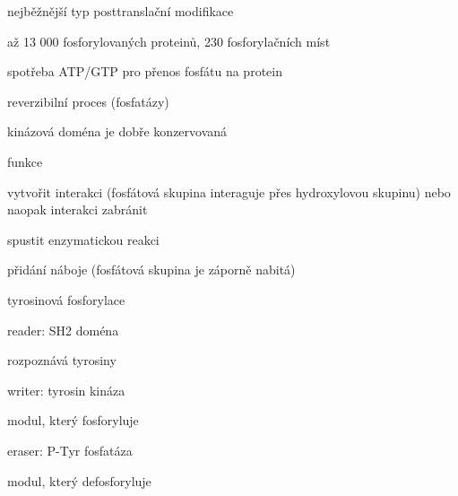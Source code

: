 \documentclass[DIV=8]{scrreprt}
\begin{document}
\begin{myItemize}[nosep]
    \item nejběžnější typ posttranslační modifikace
    \item až 13 000 fosforylovaných proteinů, 230 fosforylačních míst
    \item spotřeba ATP/GTP pro přenos fosfátu na protein
    \item reverzibilní proces (fosfatázy)
    \item kinázová doména je dobře konzervovaná
    \item funkce
\begin{myItemize}[nosep]
    \item vytvořit interakci (fosfátová skupina interaguje přes hydroxylovou skupinu) nebo naopak interakci zabránit
    \item spustit enzymatickou reakci
    \item přidání náboje (fosfátová skupina je záporně nabitá)
\end{myItemize}

    \item tyrosinová fosforylace
\begin{myItemize}[nosep]
    \item reader: SH2 doména
\begin{myItemize}[nosep]
    \item rozpoznává tyrosiny
\end{myItemize}

    \item writer: tyrosin kináza
\begin{myItemize}[nosep]
    \item modul, který fosforyluje
\end{myItemize}

    \item eraser: P-Tyr fosfatáza
\begin{myItemize}[nosep]
    \item modul, který defosforyluje
\end{myItemize}

\end{myItemize}

\end{myItemize}
\end{document}
